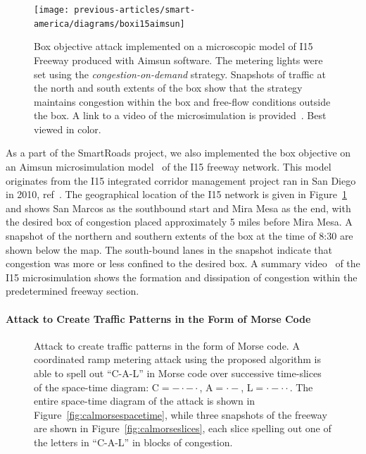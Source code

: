 \begin{figure}
	\centering
	\texttt{[image: previous-articles/smart-america/diagrams/boxi15aimsun]}
	\caption{Box objective attack implemented on a microscopic model of I15 Freeway produced with Aimsun software.  The metering lights were set using the \emph{congestion-on-demand} strategy. Snapshots of traffic at the north and south extents of the box show that the strategy maintains congestion within the box and free-flow conditions outside the box. A link to a video of the microsimulation is provided~\cite{smartroadswebsite}. Best viewed in color.}
	\label{fig:boxi15aimsun}
\end{figure}

As a part of the SmartRoads project, we also implemented the box objective on an Aimsun microsimulation model~\cite{barcelo2001microscopic} of the I15 freeway network. This model originates from the I15 integrated corridor management project ran in San Diego in 2010, ref~\cite{miller2010san}. The geographical location of the I15 network is given in Figure~\ref{fig:boxi15aimsun} and shows San Marcos as the southbound start and Mira Mesa as the end, with the desired box of congestion placed approximately 5 miles before Mira Mesa. A snapshot of the northern and southern extents of the box at the time of 8:30 are shown below the map. The south-bound lanes in the snapshot indicate that congestion was more or less confined to the desired box. A summary video~\cite{smartroadswebsite} of the I15 microsimulation shows the formation and dissipation of congestion within the predetermined freeway section.

\paragraph{Attack to Create Traffic Patterns in the Form of Morse Code}

\begin{figure}[h]%
\centering%
\hfill%
\caption{Attack to create traffic patterns in the form of Morse code. A coordinated ramp metering attack using the proposed algorithm is able to spell out ``C-A-L'' in Morse code over successive time-slices of the space-time diagram: C$=- \cdot - \cdot$, A$= \cdot -$, L$= \cdot - \cdot \cdot$. The entire space-time diagram of the attack is shown in Figure~\ref{fig:calmorsespacetime}, while three snapshots of the freeway are shown in Figure~\ref{fig:calmorseslices}, each slice spelling out one of the letters in ``C-A-L'' in blocks of congestion.}
\label{fig:cal_morse}
\end{figure}

